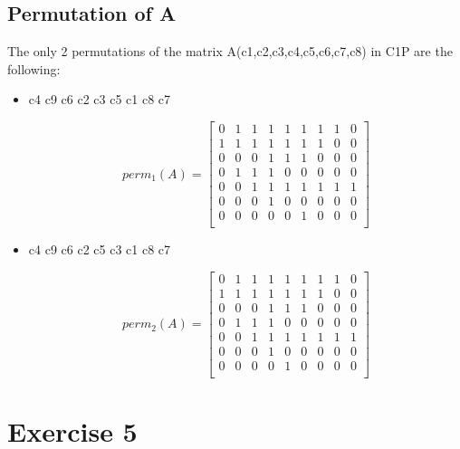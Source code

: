 \documentclass[]{article}
\begin{document}
\subsection{Permutation of A  }

The only 2 permutations of the matrix A(c1,c2,c3,c4,c5,c6,c7,c8) in C1P are the following:

\begin{itemize}

\item c4 c9 c6 c2 c3 c5 c1 c8 c7

\[perm_{1}(A)=\begin{bmatrix}
0 & 1 & 1 & 1 & 1 & 1 & 1 & 1 & 0 \\
1 & 1 & 1 & 1 & 1 & 1 & 1 & 0 & 0 \\
0 & 0 & 0 & 1 & 1 & 1 & 0 & 0 & 0 \\
0 & 1 & 1 & 1 & 0 & 0 & 0 & 0 & 0 \\
0 & 0 & 1 & 1 & 1 & 1 & 1 & 1 & 1 \\
0 & 0 & 0 & 1 & 0 & 0 & 0 & 0 & 0 \\
0 & 0 & 0 & 0 & 0 &1 & 0 & 0 & 0 \\
\end{bmatrix}\]

\item c4 c9 c6 c2 c5 c3 c1 c8 c7

\[perm_{2}(A)=\begin{bmatrix}
0 & 1 & 1 & 1 & 1 & 1 & 1 & 1 & 0 \\
1 & 1 & 1 & 1 & 1 & 1 & 1 & 0 & 0 \\
0 & 0 & 0 & 1 & 1 & 1 & 0 & 0 & 0 \\
0 & 1 & 1 & 1 & 0 & 0 & 0 & 0 & 0 \\
0 & 0 & 1 & 1 & 1 & 1 & 1 & 1 & 1 \\
0 & 0 & 0 & 1 & 0 & 0 & 0 & 0 & 0 \\
0 & 0 & 0 & 0 & 1 & 0 & 0 & 0 & 0 \\
\end{bmatrix}\]



\end{itemize}







\section{Exercise 5}
\end{document}
